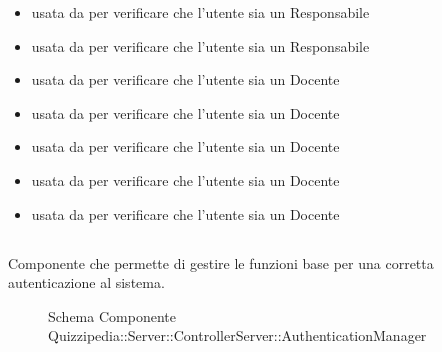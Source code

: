 \begin{itemize}
\item usata da  per verificare che l'utente sia un Responsabile
\item usata da  per verificare che l'utente sia un Responsabile
\item usata da  per verificare che l'utente sia un Docente
\item usata da  per verificare che l'utente sia un Docente
\item usata da  per verificare che l'utente sia un Docente
\item usata da  per verificare che l'utente sia un Docente
\item usata da  per verificare che l'utente sia un Docente
\end{itemize}
\subsection{}
Componente che permette di gestire le funzioni base per una corretta autenticazione al sistema.
\begin{figure}[H]
\centering
\noindent{}
\caption[Schema Componente Quizzipedia::Server::ControllerServer::AuthenticationManager]{Schema Componente Quizzipedia::Server::ControllerServer::AuthenticationManager}
\end{figure}
